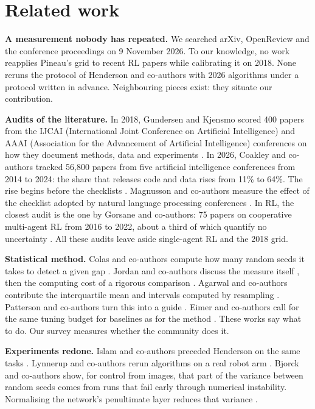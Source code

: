 \documentclass[11pt,a4paper]{article}
\begin{document}
\section{Related work}\label{related-work}

\textbf{A measurement nobody has repeated.} We searched arXiv,
OpenReview and the conference proceedings on 9 November 2026. To our
knowledge, no work reapplies Pineau's grid to recent RL papers while
calibrating it on 2018. None reruns the protocol of Henderson and
co-authors with 2026 algorithms under a protocol written in advance.
Neighbouring pieces exist: they situate our contribution.

\textbf{Audits of the literature.} In 2018, Gundersen and Kjensmo scored
400 papers from the IJCAI (International Joint Conference on Artificial
Intelligence) and AAAI (Association for the Advancement of Artificial
Intelligence) conferences on how they document methods, data and
experiments \autocite{gundersen2018state}. In 2026, Coakley and
co-authors tracked 56,800 papers from five artificial intelligence
conferences from 2014 to 2024: the share that releases code and data
rises from 11\% to 64\%. The rise begins before the checklists
\autocite{coakley2026shift}. Magnusson and co-authors measure the effect
of the checklist adopted by natural language processing conferences
\autocite{magnusson2023nlpchecklist}. In RL, the closest audit is the
one by Gorsane and co-authors: 75 papers on cooperative multi-agent RL
from 2016 to 2022, about a third of which quantify no uncertainty
\autocite{gorsane2022marl}. All these audits leave aside single-agent RL
and the 2018 grid.

\textbf{Statistical method.} Colas and co-authors compute how many
random seeds it takes to detect a given gap \autocite{colas2018seeds}.
Jordan and co-authors discuss the measure itself
\autocite{jordan2020evaluating}, then the computing cost of a rigorous
comparison \autocite{jordan2024position}. Agarwal and co-authors
contribute the interquartile mean and intervals computed by resampling
\autocite{agarwal2021precipice}. Patterson and co-authors turn this into
a guide \autocite{patterson2024empirical}. Eimer and co-authors call for
the same tuning budget for baselines as for the method
\autocite{eimer2023hyperparameters}. These works say what to do. Our
survey measures whether the community does it.

\textbf{Experiments redone.} Islam and co-authors preceded Henderson on
the same tasks \autocite{islam2017reproducibility}. Lynnerup and
co-authors rerun algorithms on a real robot arm
\autocite{lynnerup2020survey}. Bjorck and co-authors show, for control
from images, that part of the variance between random seeds comes from
runs that fail early through numerical instability. Normalising the
network's penultimate layer reduces that variance
\autocite{bjorck2022variance}.
\end{document}
